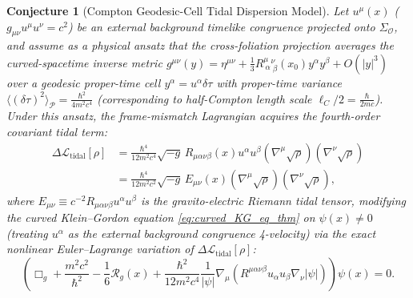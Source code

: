 \documentclass[11pt, a4paper]{article}
\newtheorem{conjecture}[theorem]{Conjecture}
\theoremstyle{definition}
\begin{document}
\begin{conjecture}[Compton Geodesic-Cell Tidal Dispersion Model]
\label{thm:tidal_dispersion}
\label{thm:tidal_correction}
Let $u^\mu(x)$ ($g_{\mu\nu}u^\mu u^\nu = c^2$) be an external background timelike congruence projected onto $\Sigma_{\mathcal{O}}$, and assume as a physical ansatz that the cross-foliation projection averages the curved-spacetime inverse metric $g^{\mu\nu}(y) = \eta^{\mu\nu} + \frac{1}{3}R^\mu_{\ \alpha}{}^\nu_{\ \beta}(x_0)y^\alpha y^\beta + O(|y|^3)$ over a geodesic proper-time cell $y^\alpha = u^\alpha \delta\tau$ with proper-time variance $\langle (\delta\tau)^2 \rangle_{\mathcal{P}} = \frac{\hbar^2}{4 m^2 c^4}$ (corresponding to half-Compton length scale $\ell_C / 2 = \frac{\hbar}{2mc}$). Under this ansatz, the frame-mismatch Lagrangian acquires the fourth-order covariant tidal term:
\begin{equation}
\label{eq:tidal_lagrangian_thm}
\begin{aligned}
\Delta \mathcal{L}_{\text{tidal}}[\rho] &= \frac{\hbar^4}{12 m^2 c^4} \sqrt{-g} \, R_{\mu\alpha\nu\beta}(x) u^\alpha u^\beta \left( \nabla^\mu \sqrt{\rho} \right) \left( \nabla^\nu \sqrt{\rho} \right) \\
&= \frac{\hbar^4}{12 m^2 c^2} \sqrt{-g} \, E_{\mu\nu}(x) \left( \nabla^\mu \sqrt{\rho} \right) \left( \nabla^\nu \sqrt{\rho} \right),
\end{aligned}
\end{equation}
where $E_{\mu\nu} \equiv c^{-2} R_{\mu\alpha\nu\beta} u^\alpha u^\beta$ is the gravito-electric Riemann tidal tensor, modifying the curved Klein--Gordon equation \eqref{eq:curved_KG_eq_thm} on $\psi(x) \neq 0$ (treating $u^\alpha$ as the external background congruence 4-velocity) via the exact nonlinear Euler--Lagrange variation of $\Delta\mathcal{L}_{\text{tidal}}[\rho]$:
\begin{equation}
\label{eq:tidal_KG_eq}
\left( \Box_g + \frac{m^2 c^2}{\hbar^2} - \frac{1}{6}\mathcal{R}_g(x) + \frac{\hbar^2}{12 m^2 c^4} \frac{1}{|\psi|} \nabla_\mu \left( R^{\mu\alpha\nu\beta} u_\alpha u_\beta \nabla_\nu |\psi| \right) \right) \psi(x) = 0.
\end{equation}
\end{conjecture}
\end{document}
